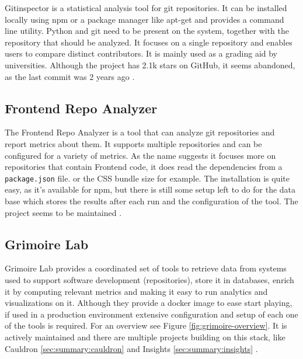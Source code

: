 \documentclass[authoryear,preprint,review,12pt]{elsarticle}
\newcommand{\code}[1]{\colorbox{mygray}{\vphantom{Tg}\lstinline|#1|}}
\begin{document}
Gitinspector is a statistical analysis tool for git repositories. It can be installed locally using
npm or a package manager like apt-get and provides a command line utility. Python and git need to
be present on the system, together with the repository that should be analyzed. It focuses on a
single repository and enables users to compare distinct contributors. It is mainly used as a
grading aid by universities. Although the project has 2.1k stars on GitHub, it seems abandoned, as
the last commit was 2 years ago \citep{EjwaGitinspector2022}.

\subsection{Frontend Repo Analyzer}
\label{sec:summary:repoanalyzer}

The Frontend Repo Analyzer is a tool that can analyze git repositories and report metrics about
them. It supports multiple repositories and can be configured for a variety of metrics. As the name
suggests it focuses more on repositories that contain Frontend code, it does read the dependencies
from a \code{package.json} file. or the CSS bundle size for example. The installation is quite
easy, as it's available for npm, but there is still some setup left to do for the data base which
stores the results after each run and the configuration of the tool. The project seems to be
maintained \citep{FrontendRepoAnalyzer2022}.

\subsection{Grimoire Lab}
\label{sec:summary:grimoire}

Grimoire Lab provides a coordinated set of tools to retrieve data from systems used to support
software development (repositories), store it in databases, enrich it by computing relevant metrics
and making it easy to run analytics and visualizations on it. Although they provide a docker image
to ease start playing, if used in a production environment extensive configuration and setup of
each one of the tools is required. For an overview see Figure \ref{fig:grimoire-overview}. It is
actively maintained and there are multiple projects building on this stack, like Cauldron
\ref{sec:summary:cauldron} and Insights \ref{sec:summary:insights}
\citep{duenasGrimoireLabToolsetSoftware2021,GrimoireLab2022}.
\end{document}
